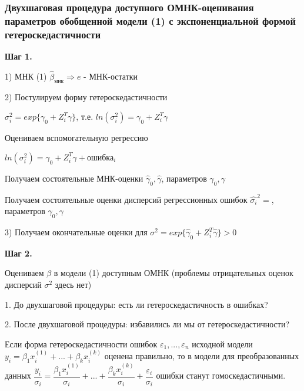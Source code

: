 \documentclass{article}
\begin{document}
\subsubsection{Двухшаговая процедура доступного ОМНК-оценивания параметров обобщенной модели (1) с экспоненциальной формой гетероскедастичности}
\textbf{Шаг 1.}

\vspace{2mm}
1) МНК (1) $\hat{\beta}_{\text{мнк}} \Longrightarrow e$ - МНК-остатки

\vspace{1mm}
2) Постулируем форму гетероскедастичности \par
$\sigma_i^2 = exp\{\gamma_0 + Z^T_i\gamma\}$, т.е. $ln(\sigma_i^2) = \gamma_0 + Z^T_i\gamma$ \par
Оцениваем вспомогательную регрессию \par
$ln(\sigma_i^2) = \gamma_0 + Z_i^T\gamma + \text{ошибка}_i$\par
Получаем состоятельные МНК-оценки $\hat{\gamma}_0, \hat{\gamma}$, параметров $\gamma_0, \gamma$\par
Получаем состоятельные оценки дисперсий регрессионных ошибок $\hat{\sigma_i}^2 = $, параметров $\gamma_0, \gamma$\par

\vspace{1mm}
3) Получаем окончательные оценки для $\sigma^2 = exp\{\hat{\gamma}_0 + Z^T_i\hat{\gamma} \} > 0$

\vspace{2mm}
\textbf{Шаг 2.}

\vspace{2mm}
Оцениваем $\beta$ в модели (1) доступным ОМНК (проблемы отрицательных оценок дисперсий $\sigma^2$ здесь нет) \par 

\vspace{1mm}
1. До двухшаговой процедуры: есть ли гетероскедастичность в ошибках?\par 
2. После двухшаговой процедуры: избавились ли мы от гетероскедастичности?\par 

\vspace{1mm}
Если форма гетероскедастичности ошибок $\varepsilon_1, ... , \varepsilon_n$ исходной модели $y_i = \beta_1x_i^{(1)} + ... + \beta_kx_i^{(k)}$ оценена правильно, то в модели для преобразованных данных $\dfrac{y_i}{\sigma_i} = \dfrac{\beta_1x_i^{(1)}}{\sigma_i} + ... + \dfrac{\beta_kx_i^{(k)}}{\sigma_i} + \dfrac{\varepsilon_i}{\sigma_i}$ ошибки станут гомоскедастичными.
\end{document}
